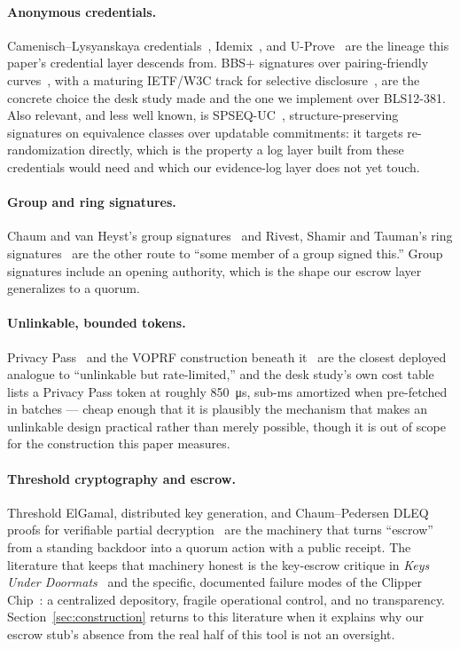 \documentclass[11pt]{article}
\begin{document}
\paragraph{Anonymous credentials.} Camenisch--Lysyanskaya
credentials~\cite{cl2001}, Idemix~\cite{idemix}, and U-Prove~\cite{uprove}
are the lineage this paper's credential layer descends from. BBS+ signatures
over pairing-friendly curves~\cite{bbsplus,bls12381}, with a maturing
IETF/W3C track for selective disclosure~\cite{bbsdraft}, are the concrete
choice the desk study made and the one we implement over BLS12-381. Also
relevant, and less well known, is SPSEQ-UC~\cite{spseq}, structure-preserving
signatures on equivalence classes over updatable commitments: it targets
re-randomization directly, which is the property a log layer built from
these credentials would need and which our evidence-log layer does not yet
touch.

\paragraph{Group and ring signatures.} Chaum and van Heyst's group
signatures~\cite{chaumvanheyst} and Rivest, Shamir and Tauman's ring
signatures~\cite{ringsig} are the other route to ``some member of a group
signed this.'' Group signatures include an opening authority, which is the
shape our escrow layer generalizes to a quorum.

\paragraph{Unlinkable, bounded tokens.} Privacy Pass~\cite{privacypass} and
the VOPRF construction beneath it~\cite{voprf} are the closest deployed
analogue to ``unlinkable but rate-limited,'' and the desk study's own cost
table lists a Privacy Pass token at roughly \SI{850}{\micro\second}, sub-ms
amortized when pre-fetched in batches --- cheap enough that it is plausibly
the mechanism that makes an unlinkable design practical rather than merely
possible, though it is out of scope for the construction this paper
measures.

\paragraph{Threshold cryptography and escrow.} Threshold ElGamal, distributed
key generation, and Chaum--Pedersen DLEQ proofs for verifiable partial
decryption~\cite{chaumpedersen} are the machinery that turns ``escrow'' from
a standing backdoor into a quorum action with a public receipt. The
literature that keeps that machinery honest is the key-escrow critique in
\emph{Keys Under Doormats}~\cite{keysunderdoormats} and the specific,
documented failure modes of the Clipper Chip~\cite{clipperchip}: a
centralized depository, fragile operational control, and no transparency.
Section~\ref{sec:construction} returns to this literature when it explains
why our escrow stub's absence from the real half of this tool is not an
oversight.
\end{document}
